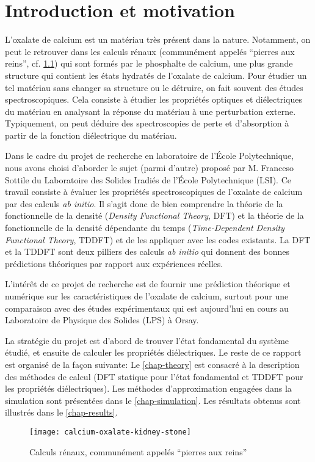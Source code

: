\chapter{Introduction et motivation}
\label{chap-intro}
L'oxalate de calcium est un matériau très présent dans la nature.
Notamment, on peut le retrouver dans les calculs rénaux
(communément appelés ``pierres aux reins'', cf. \cref{fig-calcul})
qui sont formés par le phosphalte de calcium,
une plus grande structure qui contient les états hydratés de l'oxalate de calcium.
Pour étudier un tel matériau sans changer sa structure ou le détruire,
on fait souvent des études spectroscopiques.
Cela consiste à étudier les propriétés optiques et diélectriques du matériau en
analysant la réponse du matériau à une perturbation externe.
Typiquement, on peut déduire des spectroscopies de perte et d'absorption
à partir de la fonction diélectrique du matériau.

Dans le cadre du projet de recherche en laboratoire de l'École Polytechnique,
nous avons choisi d'aborder le sujet (parmi d'autre) proposé par M. Franceso Sottile
du Laboratoire des Solides Iradiés de l'École Polytechnique (LSI).
Ce travail consiste à évaluer les propriétés spectroscopiques de l'oxalate de calcium par des calculs \textit{ab initio}.
Il s'agit donc de bien comprendre la théorie de la fonctionnelle de la densité
(\textit{Density Functional Theory}, DFT)
et la théorie de la fonctionnelle de la densité dépendante du temps
(\textit{Time-Dependent Density Functional Theory}, TDDFT)
et de les appliquer avec les codes existants.
La DFT et la TDDFT sont deux pilliers des calculs \textit{ab initio}
qui donnent des bonnes prédictions théoriques par rapport aux expériences réelles.

L'intérêt de ce projet de recherche est de fournir une prédiction théorique et numérique
sur les caractéristiques de l'oxalate de calcium,
surtout pour une comparaison avec des études expérimentaux qui est aujourd'hui en cours
au Laboratoire de Physique des Solides (LPS) à Orsay.

La stratégie du projet est d'abord de trouver l'état fondamental du système étudié,
et ensuite de calculer les propriétés diélectriques.
Le reste de ce rapport est organisé de la façon suivante:
Le \cref{chap-theory} est consacré à la description des méthodes de calcul
(DFT statique pour l'état fondamental et TDDFT pour les propriétés diélectriques).
Les méthodes d'approximation engagées dans la simulation sont présentées dans le \cref{chap-simulation}.
Les résultats obtenus sont illustrés dans le \cref{chap-results}.
\begin{figure}[h!]
  \vspace{6pt}
  \centering
  \texttt{[image: calcium-oxalate-kidney-stone]}
  \caption{Calculs rénaux, communément appelés ``pierres aux reins''}\label{fig-calcul}
\end{figure}
